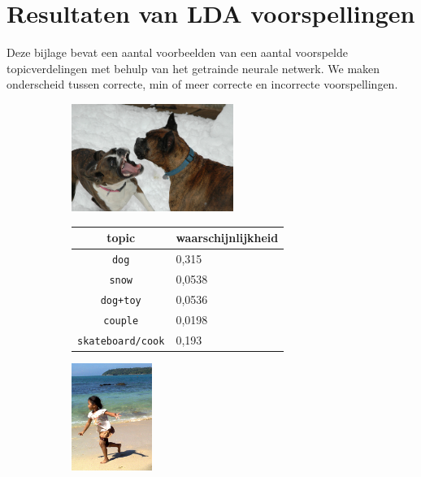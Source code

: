 \chapter{Resultaten van LDA voorspellingen}
\label{app:LDApredictions}
Deze bijlage bevat een aantal voorbeelden van een aantal voorspelde topicverdelingen met behulp van het getrainde neurale netwerk. We maken onderscheid tussen correcte, min of meer correcte en incorrecte voorspellingen.
\newpage
\begin{figure}
\begin{subfigure}{\textwidth}
    \centering
    \begin{minipage}[t][3.5cm]{.5\linewidth}
    \centering
    \vspace{0pt}
    \includegraphics[height=3.5cm]{Images/LDA/3348384389.jpg}
    \end{minipage}\hfill
    \begin{minipage}[t]{.5\textwidth}
    \centering
    \vspace{0pt}
    \begin{tabular}{cl}
            topic                           & waarschijnlijkheid\\
            \hline
            \texttt{dog}             & 0,315 \\
            \texttt{snow}                   & 0,0538 \\
            \texttt{dog+toy} & 0,0536\\
            \texttt{couple}                  & 0,0198 \\
            \texttt{skateboard/cook}           & 0,193 \\
            \hline
        \end{tabular}
    \end{minipage}
\end{subfigure}
\vspace*{4mm}
\begin{subfigure}{\textwidth}
    \centering
    \begin{minipage}[t][3.5cm]{.5\linewidth}
    \centering
    \vspace{0pt}
    \includegraphics[height=3.5cm]{Images/LDA/3107059919.jpg}

\end{minipage}
\end{subfigure}
\end{figure}
